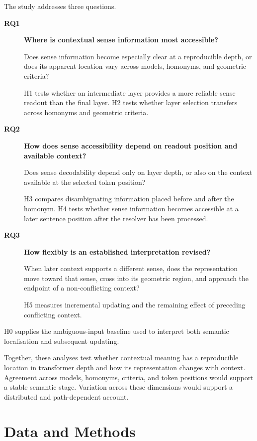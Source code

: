 \documentclass[conference]{IEEEtran}
\begin{document}
The study addresses three questions.

\begin{description}

\item[\textbf{RQ1}]
\textbf{Where is contextual sense information most accessible?}

Does sense information become especially clear at a reproducible depth, or
does its apparent location vary across models, homonyms, and geometric
criteria?

H1 tests whether an intermediate layer provides a more reliable sense readout
than the final layer. H2 tests whether layer selection transfers across homonyms
and geometric criteria.

\item[\textbf{RQ2}]
\textbf{How does sense accessibility depend on readout position and available
context?}

Does sense decodability depend only on layer depth, or also on the context
available at the selected token position?

H3 compares disambiguating information placed before and after the homonym.
H4 tests whether sense information becomes accessible at a later sentence
position after the resolver has been processed.

\item[\textbf{RQ3}]
\textbf{How flexibly is an established interpretation revised?}

When later context supports a different sense, does the representation move
toward that sense, cross into its geometric region, and approach the endpoint
of a non-conflicting context?

H5 measures incremental updating and the remaining effect of preceding
conflicting context.

\end{description}

H0 supplies the ambiguous-input baseline used to interpret both semantic
localisation and subsequent updating.

Together, these analyses test whether contextual meaning has a reproducible
location in transformer depth and how its representation changes with context.
Agreement across models, homonyms, criteria, and token positions would support
a stable semantic stage. Variation across these dimensions would support a
distributed and path-dependent account.


\section{Data and Methods}
\label{ch:methods}
\end{document}
